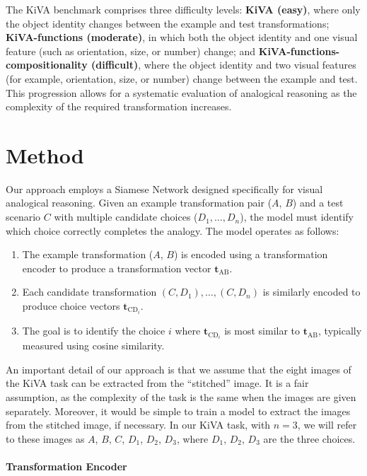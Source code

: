 \documentclass[twocolumn]{article} %
\begin{document}
The KiVA benchmark comprises three difficulty levels: \textbf{KiVA (easy)}, where only the object identity changes between the example and test transformations; \textbf{KiVA-functions (moderate)}, in which both the object identity and one visual feature (such as orientation, size, or number) change; and \textbf{KiVA-functions-compositionality (difficult)}, where the object identity and two visual features (for example, orientation, size, or number) change between the example and test. This progression allows for a systematic evaluation of analogical reasoning as the complexity of the required transformation increases.

\section{Method}

Our approach employs a Siamese Network \cite{Chicco2021SiameseOverview} designed specifically for visual analogical reasoning. Given an example transformation pair ($A$, $B$) and a test scenario $C$ with multiple candidate choices ($D_1, \dots, D_n$), the model must identify which choice correctly completes the analogy. The model operates as follows:
\begin{enumerate}
    \item The example transformation ($A$, $B$) is encoded using a transformation encoder to produce a transformation vector $\mathbf{t}_{\mathrm{AB}}$.
    \item Each candidate transformation $(C, D_1), \ldots, (C, D_n)$ is similarly encoded to produce choice vectors $\mathbf{t}_{\mathrm{CD}_i}$.
    \item The goal is to identify the choice $i$ where $\mathbf{t}_{\mathrm{CD}_i}$ is most similar to $\mathbf{t}_{\mathrm{AB}}$, typically measured using cosine similarity.
\end{enumerate}

An important detail of our approach is that we assume that the eight images of the KiVA task can be extracted from the ``stitched'' image. It is a fair assumption, as the complexity of the task is the same when the images are given separately. Moreover, it would be simple to train a model to extract the images from the stitched image, if necessary. In our KiVA task, with $n=3$, we will refer to these images as $A$, $B$, $C$, $D_1$, $D_2$, $D_3$, where $D_1$, $D_2$, $D_3$ are the three choices. 

\paragraph{Transformation Encoder}
\end{document}
